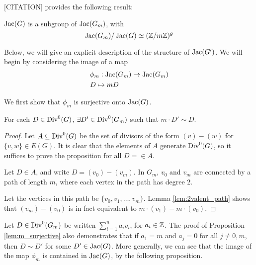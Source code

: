 \documentclass{amsart}
\begin{document}
[CITATION] provides the following result:

\begin{prop}
  \label{prop:quotient_subdivide}
  $\operatorname{Jac}(G)$ is a subgroup of $\operatorname{Jac}(G_m)$, with 
\begin{equation*}
  \operatorname{Jac}(G_m)/\operatorname{Jac}(G) \simeq (\mathbb{Z}/m\mathbb{Z})^g
\end{equation*}
\end{prop}

Below, we will give an explicit description of the structure of
$\operatorname{Jac}(G')$. We will begin by considering the image of a map
\begin{align*}
  &\phi_m:\operatorname{Jac}(G_m) \to \operatorname{Jac}(G_m)\\
  &D \mapsto mD
\end{align*}

We first show that $\phi_m$ is surjective onto $\operatorname{Jac}(G)$.

\begin{lem}
  \label{lem:m_surjective}
  For each $D \in \operatorname{Div}^0(G)$, $\exists D' \in \operatorname{Div}^0(G_m)$ such that $m
  \cdot D' \sim D$.
\end{lem}
\begin{proof}
  Let $A \subseteq \operatorname{Div}^0(G)$ be the set of divisors of the form $(v)
  - (w)$ for $\{v, w\} \in E(G)$. It is clear that the elements of $A$
  generate $\operatorname{Div}^0(G)$, so it suffices to prove the proposition for
  all $D = \in A$.
  
  Let $D \in A$, and write $D = (v_0) - (v_m)$. In $G_m$, $v_0$ and
  $v_m$ are connected by a path of length $m$, where each vertex in
  the path has degree $2$.
  
  Let the vertices in this path be $\{v_0, v_1, \ldots, v_m\}$. Lemma
  \ref{lem:2valent_path} shows that $(v_m) - (v_0)$ is in fact
  equivalent to $m \cdot (v_1) - m \cdot (v_0)$.
\end{proof}

Let $D \in \operatorname{Div}^0(G_m)$ be written $\sum_{i=1}^na_iv_i$, for $a_i \in
\mathbb{Z}$. The proof of Proposition \ref{lem:m_surjective} also
demonstrates that if $a_1 = m$ and $a_j = 0$ for all $j \ne 0, m$,
then $D \sim D'$ for some $D' \in \operatorname{Jac}(G)$. More generally, we can see
that the image of the map $\phi_m$ is contained in $\operatorname{Jac}(G)$, by the
following proposition.
\end{document}
